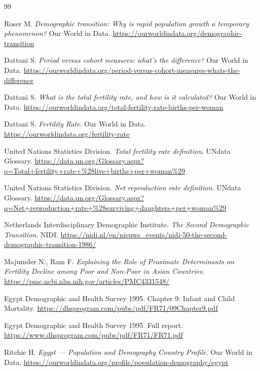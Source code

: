 \documentclass[a4paper, 14pt]{extarticle}
\begin{document}
\begin{thebibliography}{99}

Roser M. \textit{Demographic transition: Why is rapid population growth a temporary phenomenon?}
Our World in Data.
\url{https://ourworldindata.org/demographic-transition}

Dattani S. \textit{Period versus cohort measures: what's the difference?}
Our World in Data.
\url{https://ourworldindata.org/period-versus-cohort-measures-whats-the-difference}

Dattani S. \textit{What is the total fertility rate, and how is it calculated?}
Our World in Data.
\url{https://ourworldindata.org/total-fertility-rate-births-per-woman}

Dattani S. \textit{Fertility Rate}.
Our World in Data.
\url{https://ourworldindata.org/fertility-rate}

United Nations Statistics Division.
\textit{Total fertility rate definition}.
UNdata Glossary.
\url{https://data.un.org/Glossary.aspx?q=Total+fertility+rate+%28live+births+per+woman%29}

United Nations Statistics Division.
\textit{Net reproduction rate definition}.
UNdata Glossary.
\url{https://data.un.org/Glossary.aspx?q=Net+reproduction+rate+%28surviving+daughters+per+woman%29}

Netherlands Interdisciplinary Demographic Institute.
\textit{The Second Demographic Transition}.
NIDI.
\url{https://nidi.nl/en/nieuws_events/nidi-50-the-second-demographic-transition-1986/}

Majumder N., Ram F.
\textit{Explaining the Role of Proximate Determinants on Fertility Decline among Poor and Non-Poor in Asian Countries}.
\url{https://pmc.ncbi.nlm.nih.gov/articles/PMC4331548/}

Egypt Demographic and Health Survey 1995.
Chapter 9: Infant and Child Mortality.
\url{https://dhsprogram.com/pubs/pdf/FR71/09Chapter9.pdf}

Egypt Demographic and Health Survey 1995.
Full report.
\url{https://www.dhsprogram.com/pubs/pdf/FR71/FR71.pdf}

Ritchie H. \textit{Egypt — Population and Demography Country Profile}.
Our World in Data.
\url{https://ourworldindata.org/profile/population-demography/egypt}


\end{thebibliography}
\end{document}
